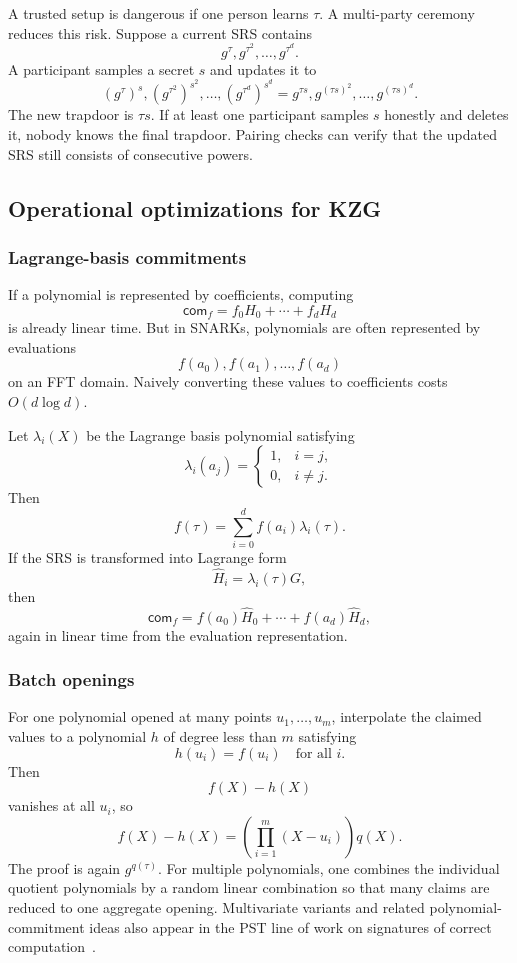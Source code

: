 \documentclass[11pt]{article}
\begin{document}
A trusted setup is dangerous if one person learns $\tau$. A multi-party ceremony reduces this risk. Suppose a current SRS contains
\[
    g^\tau,g^{\tau^2},\ldots,g^{\tau^d}.
\]
A participant samples a secret $s$ and updates it to
\[
    (g^\tau)^s,
    (g^{\tau^2})^{s^2},
    \ldots,
    (g^{\tau^d})^{s^d}
    =g^{\tau s},g^{(\tau s)^2},\ldots,g^{(\tau s)^d}.
\]
The new trapdoor is $\tau s$. If at least one participant samples $s$ honestly and deletes it, nobody knows the final trapdoor. Pairing checks can verify that the updated SRS still consists of consecutive powers.

\subsection{Operational optimizations for KZG}

\subsubsection{Lagrange-basis commitments}

If a polynomial is represented by coefficients, computing
\[
    \mathsf{com}_f=f_0H_0+\cdots+f_dH_d
\]
is already linear time. But in SNARKs, polynomials are often represented by evaluations
\[
    f(a_0),f(a_1),\ldots,f(a_d)
\]
on an FFT domain. Naively converting these values to coefficients costs $O(d\log d)$.

Let $\lambda_i(X)$ be the Lagrange basis polynomial satisfying
\[
    \lambda_i(a_j)=
    \begin{cases}
    1,&i=j,\\
    0,&i\neq j.
    \end{cases}
\]
Then
\[
    f(\tau)=\sum_{i=0}^{d} f(a_i)\lambda_i(\tau).
\]
If the SRS is transformed into Lagrange form
\[
    \widehat H_i=\lambda_i(\tau)G,
\]
then
\[
    \mathsf{com}_f=f(a_0)\widehat H_0+\cdots+f(a_d)\widehat H_d,
\]
again in linear time from the evaluation representation.

\subsubsection{Batch openings}

For one polynomial opened at many points $u_1,\ldots,u_m$, interpolate the claimed values to a polynomial $h$ of degree less than $m$ satisfying
\[
    h(u_i)=f(u_i)\quad\text{for all }i.
\]
Then
\[
    f(X)-h(X)
\]
vanishes at all $u_i$, so
\[
    f(X)-h(X)=\left(\prod_{i=1}^{m}(X-u_i)\right)q(X).
\]
The proof is again $g^{q(\tau)}$. For multiple polynomials, one combines the individual quotient polynomials by a random linear combination so that many claims are reduced to one aggregate opening. Multivariate variants and related polynomial-commitment ideas also appear in the PST line of work on signatures of correct computation~\cite{PapamanthouShiTamassia2013}.
\end{document}
